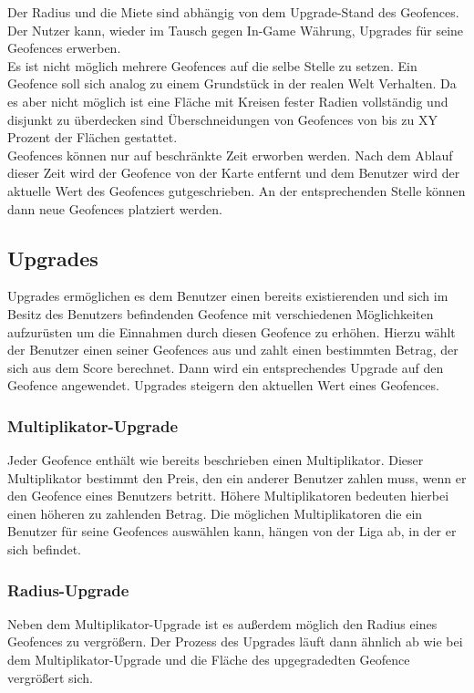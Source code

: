 \documentclass{scrreprt}
\begin{document}
Der Radius und die Miete sind abhängig von dem Upgrade-Stand des Geofences. Der Nutzer kann, wieder im Tausch gegen In-Game Währung, Upgrades für seine Geofences erwerben.\\

Es ist nicht möglich mehrere Geofences auf die selbe Stelle zu setzen. Ein Geofence soll sich analog zu einem Grundstück in der realen Welt Verhalten. Da es aber nicht möglich ist eine Fläche mit Kreisen fester Radien vollständig und disjunkt zu überdecken sind Überschneidungen von Geofences von bis zu XY Prozent der Flächen gestattet.\\  

Geofences können nur auf beschränkte Zeit erworben werden. Nach dem Ablauf dieser Zeit wird der Geofence von der Karte entfernt und dem Benutzer wird der aktuelle Wert des Geofences gutgeschrieben. An der entsprechenden Stelle können dann neue Geofences platziert werden.
\subsection{Upgrades}
Upgrades ermöglichen es dem Benutzer einen bereits existierenden und sich im Besitz des Benutzers befindenden Geofence mit verschiedenen Möglichkeiten aufzurüsten um die Einnahmen durch diesen Geofence zu erhöhen. Hierzu wählt der Benutzer einen seiner Geofences aus und zahlt einen bestimmten Betrag, der sich aus dem Score berechnet. Dann wird ein entsprechendes Upgrade auf den Geofence angewendet. Upgrades steigern den aktuellen Wert eines Geofences.
\subsubsection{Multiplikator-Upgrade}
Jeder Geofence enthält wie bereits beschrieben einen Multiplikator. Dieser Multiplikator bestimmt den Preis, den ein anderer Benutzer zahlen muss, wenn er den Geofence eines Benutzers betritt. Höhere Multiplikatoren bedeuten hierbei einen höheren zu zahlenden Betrag. Die möglichen Multiplikatoren die ein Benutzer für seine Geofences auswählen kann, hängen von der Liga ab, in der er sich befindet.
\subsubsection{Radius-Upgrade}
Neben dem Multiplikator-Upgrade ist es außerdem möglich den Radius eines Geofences zu vergrößern. Der Prozess des Upgrades läuft dann ähnlich ab wie bei dem Multiplikator-Upgrade und die Fläche des upgegradedten Geofence vergrößert sich.
\end{document}
